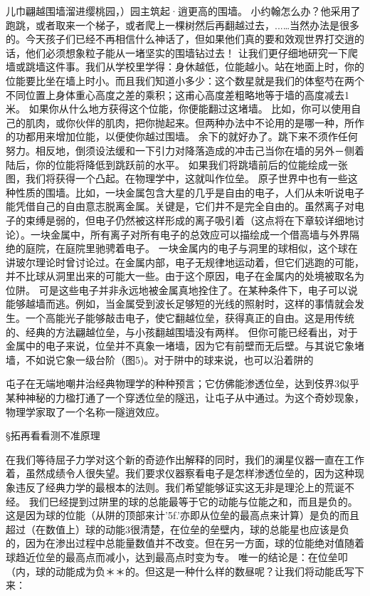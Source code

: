 儿巾翩越围墙溜进缨桃园，）园主筑起·逍更高的围墙。
小约翰怎么办？他采用了跑跳，或者取来一个梯子，或者爬上一棵树然后再翻越过去，...…当然办法是很多的。今天孩子们已经不再相信什么神话了，但如果他们真的要和效观世界打交逍的话，他们必须想象粒子能从一堵坚实的围墙钻过去！
让我们更仔细地研究一下爬墙或跳墙这件事。我们从学校里学得：身休越低，位能越小。站在地面上时，你的位能要比坐在墙上时小。而且我们知道小多少：这个数星就是我们的体壑芍在两个不同位置上身体重心高度之差的乘积；这甫心高度差粗略地等于墙的高度减去1米。
如果你从什么地方获得这个位能，你便能翻过这堵墙。
比如，你可以使用自己的肌肉，或你伙伴的肌肉，把你抛起来。但两种办法中不论用的是哪一种，所作的功都用来增加位能，以便使你越过围墙。
余下的就好办了。跳下来不须作任何努力。相反地，倒须设法缓和一下引力对降落造成的冲击己当你在墙的另外－侧着陆后，你的位能将降低到跳跃前的水平。
如果我们将跳墙前后的位能绘成一张图，我们将获得一个凸起。在物理学中，这就叫作位垒。
原子世界中也有一些这种性质的围墙。比如，一块金属包含大星的几乎是自由的电子，人们从未听说电子能凭借自己的自由意志脱离金属。关键是，它们井不是完全自由的。虽然离子对电子的束缚是弱的，但电子仍然被这样形成的离子吸引着（这点将在下章较详细地讨论）。一块金属中，所有离子对所有电子的总效应可以描绘成一个借高墙与外界隔绝的庭院，在庭院里驰骋着电子。
一块金属内的电子与洞里的球相似，这个球在讲玻尔理论时曾讨论过。在金属内部，电子无规律地运动着，但它们逃跑的可能，并不比球从洞里出来的可能大一些。由于这个原因，电子在金属内的处境被取名为位阱。
可是这些电子并非永远地被金属真地拴住了。在某种条件下，电子可以说能够越墙而逃。例如，当金属受到波长足够短的光线的照射时，这样的事情就会发生。一个高能光子能够敲击电子，使它翻越位垒，获得真正的自由。这是用传统的、经典的方法翩越位垒，与小孩翻越围墙没有两样。
但你可能已经看出，对于金属中的电子来说，位垒并不真象一堵墙，因为它有前壁而无后壁。与其说它象堵墙，不如说它象一级台阶（图5)。对于阱中的球来说，也可以沿着阱的

屯子在无端地嘲井治经典物理学的种种预言；它仿佛能渗透位垒，达到伎界3似乎某种神秘的力楹打通了一个穿透位垒的隧迅，让屯子从中通过。为这个奇妙现象，物理学家取了一个名称一隧逍效应。

§拓再看看测不准原理

在我们等待屈子力学对这个新的奇迹作出解释的同时，我们的澜星仪器一直在工作着，虽然成绩令人很失望。我们要求仪器察看电子是怎样渗透位垒的，因为这种现象违反了经典力学的最根本的法则。我们希望能够证实这无非是理沦上的荒诞不经。
我们巳经提到过阱里的球的总能最等于它的动能与位能之和，而且是负的。这是因为球的位能（从阱的顶部来计'5f.'亦即从位垒的最高点来计算）是负的而且超过（在数值上）球的动能3很清楚，在位垒的垒壁内，球的总能星也应该是负的，因为在渗出过程中总能量数值并不改变。但在另一方面，球的位能绝对值随着球趋近位垒的最高点而减小，达到最高点时变为专。
唯一的结论是：在位垒叩（内，球的动能成为负＊＊的。但这是一种什么样的数昼呢？让我们将动能氐写下来：

